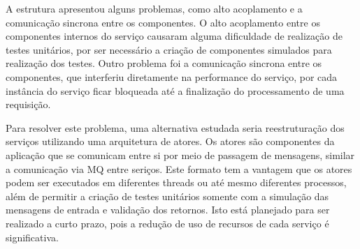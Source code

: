 A estrutura apresentou alguns problemas, como alto acoplamento e a
comunicação sincrona entre os componentes. O alto acoplamento entre
os componentes internos do serviço causaram alguma dificuldade de
realização de testes unitários, por ser necessário a criação de
componentes simulados para realização dos testes. Outro problema foi a
comunicação sincrona entre os componentes, que interferiu diretamente
na performance do serviço, por cada instância do serviço ficar bloqueada
até a finalização do processamento de uma requisição.

Para resolver este problema, uma alternativa estudada seria reestruturação
dos serviços utilizando uma arquitetura de atores. Os atores são componentes
da aplicação que se comunicam entre si por meio de passagem de mensagens,
similar a comunicação via \ac{MQ} entre seriços. Este formato tem a vantagem
que os atores podem ser executados em diferentes threads ou até mesmo
diferentes processos, além de permitir a criação de testes unitários
somente com a simulação das mensagens de entrada e validação dos retornos.
Isto está planejado para ser realizado a curto prazo, pois a redução de
uso de recursos de cada serviço é significativa.
